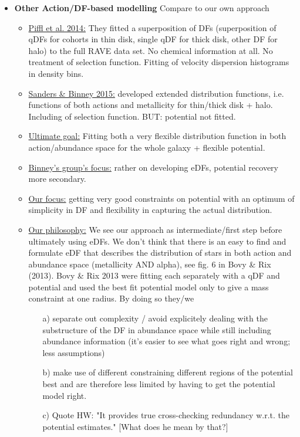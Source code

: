\begin{itemize}
\item \textbf{Other Action/DF-based modelling} Compare to our own approach
\begin{itemize}
\item \underline{Piffl et al. 2014:} They fitted a superposition of DFs (superposition of qDFs for cohorts in thin disk, single qDF for thick disk, other DF for halo) to the full RAVE data set. No chemical information at all. No treatment of selection function. Fitting of velocity dispersion histograms in density bins.
\item  \underline{Sanders \& Binney 2015:} developed extended distribution functions, i.e. functions of both actions and metallicity for thin/thick disk + halo. Including of selection function. BUT: potential not fitted.
\item \underline{Ultimate goal:} Fitting both a very flexible distribution function in both action/abundance space for the whole galaxy + flexible potential.
\item \underline{Binney's group's focus:} rather on developing eDFs, potential recovery more secondary.
\item \underline{Our focus:} getting very good constraints on potential with an optimum of simplicity in DF and flexibility in capturing the actual distribution. 
\item \underline{Our philosophy:} We see our approach as intermediate/first step before ultimately using eDFs. We don't think that there is an easy to find and formulate eDF that describes the distribution of stars in both action and abundance space (metallicity AND alpha), see fig. 6 in Bovy \& Rix (2013). Bovy \& Rix 2013 were fitting each \MAP separately with a qDF and potential and used the best fit potential model only to give a mass constraint at one radius. By doing so they/we 
\begin{itemize}
\item[a)] separate out complexity / avoid explicitely dealing with the substructure of the DF in abundance space while still including abundance information (it's easier to see what goes right and wrong; less assumptions) 
\item[b)] make use of different \MAPs constraining different regions of the potential best and are therefore less limited by having to get the potential model right.
\item[c)] Quote HW: "It provides true cross-checking redundancy w.r.t. the potential estimates." [What does he mean by that?]
\end{itemize}
\end{itemize}


\end{itemize}
